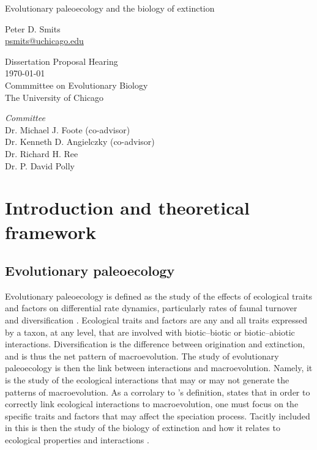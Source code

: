 \documentclass[12pt,letterpaper]{article}
\begin{document}
\setcounter{secnumdepth}{0}

\begin{titlepage}
  \begin{center}
    \huge{Evolutionary paleoecology and the biology of extinction}

    \vspace{1.5cm}

    \large{Peter D. Smits \\}
    \footnotesize{\href{mailto:psmits@uchicago.edu}{psmits@uchicago.edu}}

    \vspace{1.5cm}

    Dissertation Proposal Hearing \\
    \today \\
    Commmittee on Evolutionary Biology \\
    The University of Chicago

    \vspace{1.5cm}

    \textit{Committee} \\
    Dr. Michael J. Foote (co-advisor) \\
    Dr. Kenneth D. Angielczky (co-advisor) \\
    Dr. Richard H. Ree \\
    Dr. P. David Polly
  \end{center}
\end{titlepage}

\linenumbers
\modulolinenumbers[2]


\section{Introduction and theoretical framework}

\subsection{Evolutionary paleoecology}
Evolutionary paleoecology is defined as the study of the effects of ecological traits and factors on differential rate dynamics, particularly rates of faunal turnover and diversification \citep{Kitchell1985a}. Ecological traits and factors are any and all traits expressed by a taxon, at any level, that are involved with biotic--biotic or biotic--abiotic interactions. Diversification is the difference between origination and extinction, and is thus the net pattern of macroevolution. The study of evolutionary paleoecology is then the link between interactions and macroevolution. Namely, it is the study of the ecological interactions that  may or may not generate the patterns of macroevolution. As a corrolary to \citet{Kitchell1985a}'s definition, \citet{Allmon1994} states that in order to correctly link ecological interactions to macroevolution, one must focus on the specific traits and factors that may affect the speciation process. Tacitly included in this is then the study of the biology of extinction and how it relates to ecological properties and interactions \citep{Kitchell1990}.
\end{document}
